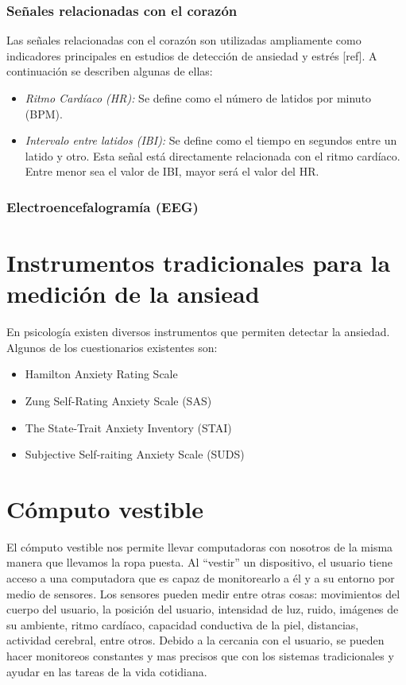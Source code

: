 	\subsubsection{Se\~nales relacionadas con el coraz\'on}\label{secc:hearthrate}
	Las se\~nales relacionadas con el coraz\'on son utilizadas ampliamente como indicadores principales en estudios de detecci\'on de ansiedad y estr\'es [ref]. A continuaci\'on se describen algunas de ellas:
	\begin{itemize}
		\item \textit{Ritmo Card\'iaco (HR):} Se define como el n\'umero de latidos por minuto (BPM).
		\item \textit{Intervalo entre latidos (IBI):} Se define como el tiempo en segundos entre un latido y otro. Esta se\~nal est\'a directamente relacionada con el ritmo card\'iaco. Entre menor sea el valor de IBI, mayor ser\'a el valor del HR.
	\end{itemize}
	\subsubsection{Electroencefalogram\'ia (EEG)}\label{secc:eeg}

\section{Instrumentos tradicionales para la medici\'on de la ansiead}
        En psicolog\'ia existen diversos instrumentos que permiten detectar la ansiedad. Algunos de los cuestionarios existentes son:
        \begin{itemize}

                \item Hamilton Anxiety Rating Scale

                \item Zung Self-Rating Anxiety Scale (SAS)

                \item The State-Trait Anxiety Inventory (STAI)
                \item Subjective Self-raiting Anxiety Scale (SUDS)
        \end{itemize}


\section{C\'omputo vestible}\label{secc:dementia}
El c\'omputo vestible nos permite llevar computadoras con nosotros de la misma manera que llevamos la ropa puesta. Al ``vestir'' un dispositivo, el usuario tiene acceso a una computadora que es capaz de monitorearlo a \'el y a su entorno por medio de sensores. Los sensores pueden medir entre otras cosas: movimientos del cuerpo del usuario, la posici\'on del usuario, intensidad de luz, ruido, im\'agenes de su ambiente, ritmo card\'iaco, capacidad conductiva de la piel, distancias, actividad cerebral, entre otros. Debido a la cercania con el usuario, se pueden hacer monitoreos constantes y mas precisos que con los sistemas tradicionales y ayudar en las tareas de la vida cotidiana.

